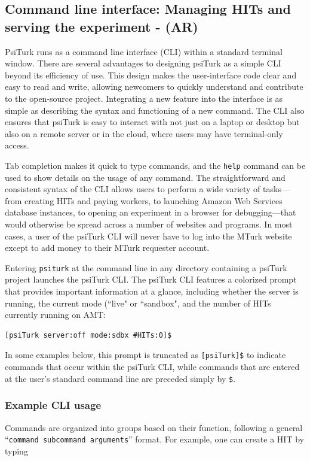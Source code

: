 \documentclass[twocolumn]{svjour3}          %
\begin{document}
\subsection{Command line interface: Managing HITs and serving the experiment - (AR)}

PsiTurk runs as a command line interface (CLI) within a standard terminal window.
There are several advantages to designing psiTurk as a simple CLI beyond its efficiency of use. This
design makes the user-interface code clear and easy to read and write, allowing newcomers to quickly
understand and contribute to the open-source project. Integrating a new feature into the interface
is as simple as describing the syntax and functioning of a new command. The CLI also ensures that
psiTurk is easy to interact with not just on a laptop or desktop but also on a remote server or in
the cloud, where users may have terminal-only access.
 
Tab completion makes it quick to type commands, and the \texttt{help} command can be used to show
details on the usage of any command. 
The straightforward and consistent syntax of the CLI allows
users to perform a wide variety of tasks---from creating HITs and paying workers, to launching Amazon
Web Services database instances, to opening an experiment in a browser for debugging---that
would otherwise be spread across a number of websites and programs. In most cases, a user of the
psiTurk CLI will never have to log into the MTurk website except to add money to their MTurk
requester account.


Entering
\texttt{psiturk} at the command line in any directory containing a psiTurk project launches the
psiTurk CLI.
The psiTurk CLI features a colorized prompt that provides important information at a glance, including
whether the server is running, the current mode (``live" or ``sandbox", and the number of HITs currently running on AMT:

\begin{lstlisting}
[psiTurk server:off mode:sdbx #HITs:0]$
\end{lstlisting}

\noindent In some examples below, this prompt is truncated as \texttt{[psiTurk]\$} to indicate commands that occur within the psiTurk CLI, while commands that are entered at the user's standard command line are preceded simply by \texttt{\$}.


\subsubsection{Example CLI usage}
Commands are organized into groups based on their function, following a general ``\texttt{command subcommand
arguments}'' format. For example, one can create a HIT by typing 
\end{document}
